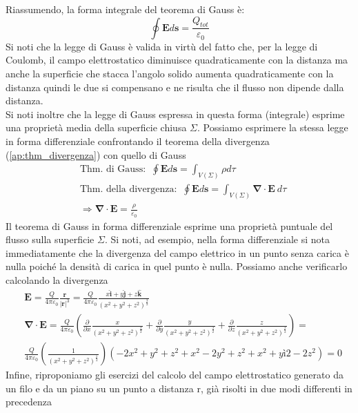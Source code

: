 \documentclass[10pt,a4paper]{article}
\begin{document}
Riassumendo, la forma integrale del teorema di Gauss è:
\[\oint\mathbf{E}d\mathbf{s} = \frac{Q_{tot}}{\varepsilon_0}\]
Si noti che la legge di Gauss è valida in virtù del fatto che, per la legge di Coulomb, il campo elettrostatico diminuisce quadraticamente con la distanza ma anche la superficie che stacca l'angolo solido aumenta quadraticamente con la distanza quindi le due si compensano e ne risulta che il flusso non dipende dalla distanza.\\
Si noti inoltre che la legge di Gauss espressa in questa forma (integrale) esprime una proprietà media della superficie chiusa $\Sigma$. Possiamo esprimere la stessa legge in forma differenziale confrontando il teorema della divergenza (\ref{ap:thm_divergenza}) con quello di Gauss
\begin{align*}
	&\text{Thm. di Gauss: }\ \oint\mathbf{E}d\mathbf{s} = \int_{V(\Sigma)}\rho d\tau\\
	&\text{Thm. della divergenza: }\ \oint\mathbf{E}d\mathbf{s} = \int_{V(\Sigma)}\mathbf{\nabla}\cdot\mathbf{E}\ d\tau \\
	&\Rightarrow \mathbf{\nabla}\cdot\mathbf{E} = \frac{\rho}{\varepsilon_0}
\end{align*} 
Il teorema di Gauss in forma differenziale esprime una proprietà puntuale del flusso sulla superficie $\Sigma$. Si noti, ad esempio, nella forma differenziale si nota immediatamente che la divergenza del campo elettrico in un punto senza carica è nulla poiché la densità di carica in quel punto è nulla. Possiamo anche verificarlo calcolando la divergenza
\begin{align*}
	&\mathbf{E} = \frac{Q}{4\pi\varepsilon_0}\frac{\mathbf{r}}{|\mathbf{r}|^3} = \frac{Q}{4\pi\varepsilon_0}\frac{x\hat{\mathbf{i}}+y\hat{\mathbf{j}}+z\hat{\mathbf{k}}}{(x^2+y^2+z^2)^{\frac{3}{2}}}\\
	&\mathbf{\nabla}\cdot\mathbf{E} = \frac{Q}{4\pi\varepsilon_0}\left(\frac{\partial}{\partial x}\frac{x}{(x^2+y^2+z^2)^{\frac{3}{2}}}+\frac{\partial}{\partial y}\frac{y}{(x^2+y^2+z^2)^{\frac{3}{2}}}+\frac{\partial}{\partial z}\frac{z}{(x^2+y^2+z^2)^{\frac{3}{2}}}\right)=\\
	& \frac{Q}{4\pi\varepsilon_0}\left(\frac{1}{(x^2+y^2+z^2)^{\frac{5}{2}}}\right)(-2x^2+y^2+z^2+x^2-2y^2+z^2+x^2+yì2-2z^2) = 0
\end{align*}
Infine, riproponiamo gli esercizi del calcolo del campo elettrostatico generato da un filo e da un piano su un punto a distanza r, già risolti in due modi differenti in precedenza
\end{document}
